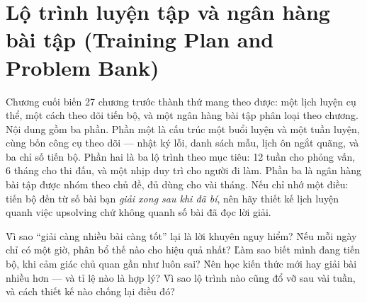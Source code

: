 \documentclass[../../algorithm.tex]{subfiles}
\begin{document}
\chapter{Lộ trình luyện tập và ngân hàng bài tập (Training Plan and Problem Bank)}

\begin{tomtat}
Chương cuối biến 27 chương trước thành thứ mang theo được: một lịch luyện cụ thể, một cách theo dõi tiến bộ, và một ngân hàng bài tập phân loại theo chương. Nội dung gồm ba phần. Phần một là cấu trúc một buổi luyện và một tuần luyện, cùng bốn công cụ theo dõi --- nhật ký lỗi, danh sách mẫu, lịch ôn ngắt quãng, và ba chỉ số tiến bộ. Phần hai là ba lộ trình theo mục tiêu: 12 tuần cho phỏng vấn, 6 tháng cho thi đấu, và một nhịp duy trì cho người đi làm. Phần ba là ngân hàng bài tập được nhóm theo chủ đề, đủ dùng cho vài tháng. Nếu chỉ nhớ một điều: tiến bộ đến từ số bài bạn \emph{giải xong sau khi đã bí}, nên hãy thiết kế lịch luyện quanh việc upsolving chứ không quanh số bài đã đọc lời giải.
\end{tomtat}

\begin{nentang}
\end{nentang}

\begin{khoigoi}
\h{Vì sao ``giải càng nhiều bài càng tốt'' lại là lời khuyên nguy hiểm?}
\h{Nếu mỗi ngày chỉ có một giờ, phân bổ thế nào cho hiệu quả nhất?}
\h{Làm sao biết mình đang tiến bộ, khi cảm giác chủ quan gần như luôn sai?}
\h{Nên học kiến thức mới hay giải bài nhiều hơn --- và tỉ lệ nào là hợp lý?}
\h{Vì sao lộ trình nào cũng đổ vỡ sau vài tuần, và cách thiết kế nào chống lại điều đó?}
\end{khoigoi}
\end{document}
